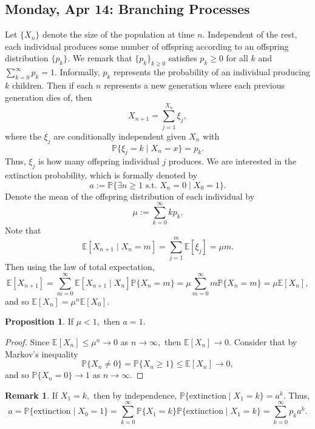 \documentclass[10pt, oneside]{article}
\newcommand{\bbP}{\mathbb{P}}
\newcommand{\bbE}{\mathbb{E}}
\theoremstyle{definition}
\newtheorem{prop}{Proposition}
\newtheorem{rem}{Remark}
\begin{document}
\newpage
\subsection{Monday, Apr 14: Branching Processes}
Let $\{X_n\}$ denote the size of the population at time $n.$ Independent of the rest, each individual produces some number of offspring according to an offspring distribution $\{p_k\}.$ We remark that 
$\{p_k\}_{k\geq 0}$ satisfies $p_k \geq 0$ for all $k$ and $\sum_{k=0}^\infty p_k = 1.$ Informally, $p_k$ represents the probability of an individual producing $k$ children. Then if each $n$ represents a new generation where each previous generation dies of, then 
\[X_{n+1} = \sum_{j=1}^{X_n} \xi_j,\] where the $\xi_j$ are conditionally independent given $X_n$ with 
\[\bbP\{\xi_j  =k \mid X_n = x\} = p_k.\] Thus, $\xi_j$ is how many offspring individual $j$ produces. We are interested in the extinction probability, which is formally denoted by 
\[a:= \bbP\{\exists n\geq 1 \text{ s.t. } X_n = 0 \mid X_0 = 1\}.\] Denote the mean of the offspring distribution of each individual by 
\[\mu:= \sum_{k=0}^\infty kp_k.\] Note that 
\[\bbE[X_{n+1} \mid X_n = m] = \sum_{j=1}^m \bbE[\xi_j] = \mu m.\] Then using the law of total expectation, \[\bbE[X_{n+1}] = \sum_{m=0}^\infty\bbE[X_{n+1} \mid X_n]\bbP\{X_n = m\} = \mu \sum_{m=0}^\infty m\bbP\{X_n = m\} = \mu \bbE[X_n],\] and so $\bbE[X_n] = \mu^n \bbE[X_0].$

\begin{prop}
    If $\mu < 1,$ then $a = 1.$ 
\end{prop}
\begin{proof}
    Since $\bbE[X_n] \leq \mu^n \to 0$ as $n\to \infty,$ then $\bbE[X_n] \to 0.$ Consider that by Markov's inequality
    \[\bbP\{X_n \neq 0\} = \bbP\{X_n \geq 1\} \leq \bbE[X_n]\to 0,\] and so $\bbP\{X_n = 0\} \to 1$ as $n\to \infty.$ 
\end{proof}

\begin{rem}
    If $X_1 = k,$ then by independence, $\bbP\{\text{extinction} \mid X_1 = k\} = a^k.$ Thus, 
    \[a = \bbP\{\text{extinction} \mid X_0 = 1\} = \sum_{k=0}^\infty \bbP\{X_1 = k\}\bbP\{\text{extinction} \mid X_1 = k\} = \sum_{k=0}^\infty p_k a^k.\]
\end{rem}
\end{document}
